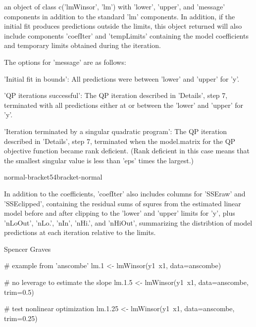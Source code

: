 \documentclass{article}
\begin{document}
\begin{Value}
an object of class c('lmWinsor', 'lm') with 'lower', 'upper', and
'message' components in addition to the standard 'lm' components.  In
addition, if the initial fit produces predictions outside the limits,
this object returned will also include components 'coefIter' and
'tempLimits' containing the model coefficients and temporary limits
obtained during the iteration.  

The options for 'message' are as follows:  

\begin{ldescription}
\item[\code{1}] 'Initial fit in bounds':  All predictions were between 'lower' and
'upper' for 'y'. 

\item[\code{2}] 'QP iterations successful':  The QP iteration described in
'Details', step 7, terminated with all predictions either at or
between the 'lower' and 'upper' for 'y'.  

\item[\code{3}] 'Iteration terminated by a singular quadratic program':  The QP
iteration described in 'Details', step 7, terminated when the
model.matrix for the QP objective function became rank deficient.
(Rank deficient in this case means that the smallest singular
value is less than 'eps' times the largest.) 

\end{ldescription}

normal-bracket54bracket-normal

In addition to the coefficients, 'coefIter' also includes columns for
'SSEraw' and 'SSEclipped', containing the residual sums of squres from
the estimated linear model before and after clipping to the 'lower'
and 'upper' limits for 'y', plus 'nLoOut', 'nLo.', 'nIn', 'nHi.', and
'nHiOut', summarizing the distribtion of model predictions at each
iteration relative to the limits.
\end{Value}
\begin{Author}\relax
Spencer Graves
\end{Author}
\begin{SeeAlso}\relax
{}
\end{SeeAlso}
\begin{Examples}
\begin{ExampleCode}
# example from 'anscombe' 
lm.1 <- lmWinsor(y1~x1, data=anscombe)

# no leverage to estimate the slope 
lm.1.5 <- lmWinsor(y1~x1, data=anscombe, trim=0.5)

# test nonlinear optimization  
lm.1.25 <- lmWinsor(y1~x1, data=anscombe, trim=0.25)

\end{ExampleCode}
\end{Examples}
\end{document}
